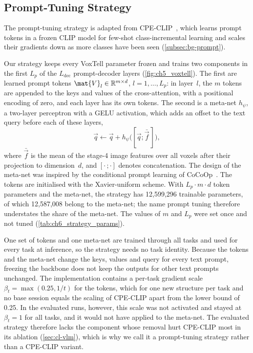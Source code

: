 \subsection{Prompt-Tuning Strategy}
\label{subsec:method-prompt}

The prompt-tuning strategy is adapted from CPE-CLIP~\cite{D_Alessandro_2023}, which learns prompt tokens in a frozen CLIP model for few-shot class-incremental learning and scales their gradients down as more classes have been seen (\cref{subsec:bg-prompt}).

Our strategy keeps every VoxTell parameter frozen and trains two components in the first $L_p$ of the $L_{\mathrm{dec}}$ prompt-decoder layers (\cref{fig:ch5_voxtell}).
The first are learned prompt tokens $\mat{V}_l \in \mathbb{R}^{m \times d}$, $l = 1, \dots, L_p$: in layer~$l$, the $m$ tokens are appended to the keys and values of the cross-attention, with a positional encoding of zero, and each layer has its own tokens.
The second is a meta-net $h_\psi$, a two-layer perceptron with a GELU activation, which adds an offset to the text query before each of these layers,
\begin{equation}
\vec{q} \leftarrow \vec{q} + h_\psi\big([\vec{q}; \bar{\vec{f}}\,]\big),
\label{eq:method-metanet}
\end{equation}
where $\bar{\vec{f}}$ is the mean of the stage-4 image features over all voxels after their projection to dimension~$d$, and $[\cdot\,;\cdot]$ denotes concatenation.
The design of the meta-net was inspired by the conditional prompt learning of CoCoOp~\cite{zhou2022cocoop}.
The tokens are initialised with the Xavier-uniform scheme.
With $L_p \cdot m \cdot d$ token parameters and the meta-net, the strategy has 12{,}599{,}296 trainable parameters, of which 12{,}587{,}008 belong to the meta-net; the name prompt tuning therefore understates the share of the meta-net.
The values of $m$ and $L_p$ were set once and not tuned (\cref{tab:ch6_strategy_params}).

One set of tokens and one meta-net are trained through all tasks and used for every task at inference, so the strategy needs no task identity.
Because the tokens and the meta-net change the keys, values and query for every text prompt, freezing the backbone does not keep the outputs for other text prompts unchanged.
The implementation contains a per-task gradient scale $\beta_t = \max(0.25, 1/t)$ for the tokens, which for one new structure per task and no base session equals the scaling of CPE-CLIP apart from the lower bound of 0.25.
In the evaluated runs, however, this scale was not activated and stayed at $\beta_t = 1$ for all tasks, and it would not have applied to the meta-net.
The evaluated strategy therefore lacks the component whose removal hurt CPE-CLIP most in its ablation (\cref{sec:cl-vlm}), which is why we call it a prompt-tuning strategy rather than a CPE-CLIP variant.


